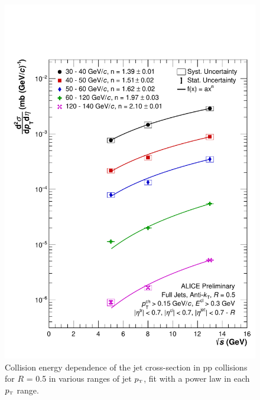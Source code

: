 \documentclass[ALICE]{ALICE_analysis_notes}
\newcommand{\pT}{$p_{\mbox{\tiny T}}$\xspace}
\newcommand{\pp}{pp\xspace}
\begin{document}
\begin{appendix}
\begin{figure}[h!]
    \centering
    \includegraphics[width=15cm]{figures/EnergyComparisons/sqrtSComp_R05.pdf}
    \caption{Collision energy dependence of the jet cross-section in \pp collisions for $R$ = 0.5 in various ranges of jet \pT, fit with a power law in each \pT range.}
    \label{fig:appSqrtSCompareR05}
\end{figure}


\end{appendix}
\end{document}

